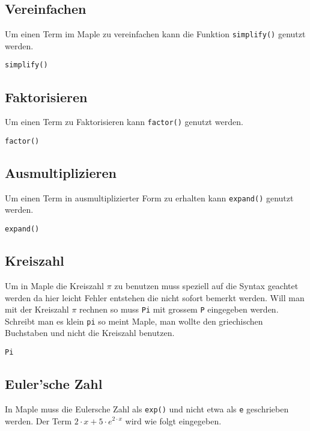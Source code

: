 \subsection{Vereinfachen}
Um einen Term im Maple zu vereinfachen kann die Funktion \verb!simplify()!
genutzt werden.

\begin{lstlisting}[caption=Vereinfachen, label=Vereinfachen]
simplify()
\end{lstlisting}

\subsection{Faktorisieren}
Um einen Term zu Faktorisieren kann \verb!factor()! genutzt werden.

\begin{lstlisting}[caption=Faktorisieren, label=Faktorisieren]
factor()
\end{lstlisting}

\subsection{Ausmultiplizieren}
Um einen Term in ausmultiplizierter Form zu erhalten kann \verb!expand()!
genutzt werden.

\begin{lstlisting}[caption=Ausmultiplizieren, label=Ausmultiplizieren]
expand()
\end{lstlisting}

\subsection{Kreiszahl}
Um in Maple die Kreiszahl $\pi$ zu benutzen muss speziell auf die Syntax
geachtet werden da hier leicht Fehler entstehen die nicht sofort bemerkt 
werden. Will man mit der Kreiszahl $\pi$ rechnen so muss \verb!Pi! 
mit grossem \verb!P! eingegeben werden. Schreibt man es klein \verb!pi!
so meint Maple, man wollte den griechischen Buchstaben und nicht die 
Kreiszahl benutzen.

\begin{lstlisting}[caption=Pi, label=Pi]
Pi
\end{lstlisting}

\subsection{Euler'sche Zahl}
In Maple muss die Eulersche Zahl als \verb!exp()! und nicht etwa als 
\verb!e! geschrieben werden. Der Term $2 \cdot x + 5 \cdot e^{2 \cdot x}$
wird wie folgt eingegeben.

